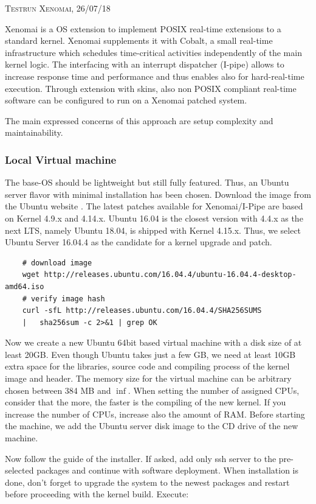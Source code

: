 \documentclass[]{scrartcl}
\begin{document}
{\small\textsc{Testrun Xenomai, 26/07/18} \bigskip}

Xenomai is a OS extension to implement POSIX real-time extensions to a standard kernel. Xenomai supplements it with Cobalt, a small real-time infrastructure which schedules time-critical activities independently of the main kernel logic. The interfacing with an interrupt dispatcher (I-pipe) allows to increase response time and performance and thus enables also for hard-real-time execution. Through extension with skins, also non POSIX compliant real-time software can be configured to run on a Xenomai patched system.

The main expressed concerns of this approach are setup complexity and maintainability.

\subsubsection{Local Virtual machine}
\label{sec:xenoinst}

The base-OS should be lightweight but still fully featured. Thus, an Ubuntu server flavor with minimal installation has been chosen. Download the image from the Ubuntu website \cite{ubuntu02}. The latest patches available for Xenomai/I-Pipe are based on Kernel 4.9.x and 4.14.x. Ubuntu 16.04 is the closest version with 4.4.x as the next LTS, namely Ubuntu 18.04, is shipped with Kernel 4.15.x. Thus, we select Ubuntu Server 16.04.4 as the candidate for a kernel upgrade and patch.

\begin{verbatim}
	# download image
	wget http://releases.ubuntu.com/16.04.4/ubuntu-16.04.4-desktop-amd64.iso
	# verify image hash
	curl -sfL http://releases.ubuntu.com/16.04.4/SHA256SUMS
	|	sha256sum -c 2>&1 | grep OK
\end{verbatim}

Now we create a new Ubuntu 64bit based virtual machine with a disk size of at least 20GB. Even though Ubuntu takes just a few GB, we need at least 10GB extra space for the libraries, source code and compiling process of the kernel image and header. 
The memory size for the virtual machine can be arbitrary chosen between 384 MB and $\inf$. When setting the number of assigned CPUs, consider that the more, the faster is the compiling of the new kernel. If you increase the number of CPUs, increase also the amount of RAM.
Before starting the machine, we add the Ubuntu server disk image to the CD drive of the new machine.

Now follow the guide of the installer. If asked, add only ssh server to the pre-selected packages and continue with software deployment. When installation is done, don't forget to upgrade the system to the newest packages and restart before proceeding with the kernel build. Execute:
\end{document}
